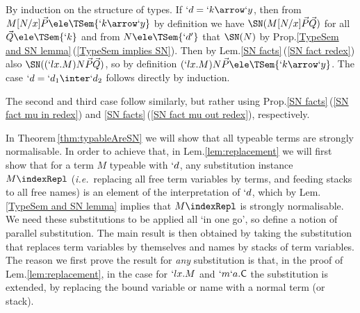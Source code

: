 \documentclass{CSML}
\def\ie{\emph{i.e.}}
\newcommand{\vect}[1]{\vec{#1}}
\begin{document}
 \begin{Proof} 

By induction on the structure of types.
If $`d = `k\arrow `y$, then from $M[N/x]\vect{P} \ele \TSem{`k\arrow `y}$ by definition we have $ \SN(M[N/x]\vect{P}\vect{Q})$ for all $\vect{Q} \ele \TSem{`k} $ and from $N \ele \TSem{`d'}$ that $\SN(N)$ by Prop.\skp\ref{TypeSem and SN lemma}\,(\ref{TypeSem implies SN}).
Then by Lem.\skp\ref {SN facts}\,(\ref{SN fact redex}) also $ \SN((`lx.M)N\vect{P}\vect{Q}) $, so by definition $(`lx.M)N\vect{P} \ele \TSem{`k\arrow `y}$.
The case $`d = `d_1\inter`d_2$ follows directly by induction.

The second and third case follow similarly, but rather using Prop.\skp\ref {SN facts}\,(\ref{SN fact mu in redex}) and \ref {SN facts}\,(\ref{SN fact mu out redex}), respectively.
 \end{Proof}

In Theorem\,\ref{thm:typableAreSN} we will show that all typeable terms are strongly normalisable.
In order to achieve that, in Lem.\skp\ref{lem:replacement} we will first show that for a term $M$ typeable with $`d$, any substitution instance $M \indexRepl $ (\ie~replacing all free term variables by terms, and feeding stacks to all free names) is an element of the interpretation of $`d$, which by Lem.\skp\ref{TypeSem and SN lemma} implies that $M \indexRepl $ is strongly normalisable.
We need these substitutions to be applied all `in one go', so define a notion of parallel substitution.
The main result is then obtained by taking the substitution that replaces term variables by themselves and names by stacks of term variables.
The reason we first prove the result for \emph{any} substitution is that, in the proof of Lem.\skp\ref{lem:replacement}, in the case for $`lx.M$ and $`m`a.\textrm{\sf C}$ the substitution is extended, by replacing the bound variable or name with a normal term (or stack).
\end{document}
